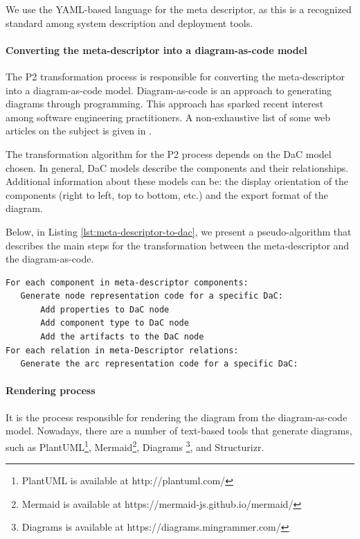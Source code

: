 \documentclass[sigconf]{acmart}
\begin{document}
We use the YAML-based language for the meta descriptor, as this is a recognized standard among system description and deployment tools.

\paragraph{\textbf{Converting the meta-descriptor into a diagram-as-code model}} The P2 transformation process is responsible for converting the meta-descriptor into a diagram-as-code model. Diagram-as-code is an approach to generating diagrams through programming. This approach has sparked recent interest among software engineering practitioners. A non-exhaustive list of some web articles on the subject is given in \cite{flaatten2020, meyer2019, mingrammer2020, brown2020a}. 

The transformation algorithm for the P2 process depends on the DaC model chosen. In general, DaC models describe the components and their relationships. Additional information about these models can be: the display orientation of the components (right to left, top to bottom, etc.) and the export format of the diagram. 

Below, in Listing \ref{lst:meta-descriptor-to-dac}, we present a pseudo-algorithm that describes the main steps for the transformation between the meta-descriptor and the diagram-as-code.

\begin{lstlisting}[caption={Meta-descriptor to Diagram-as-Code algorithm}, label={lst:meta-descriptor-to-dac}]
For each component in meta-descriptor components:
   Generate node representation code for a specific DaC:
       Add properties to DaC node
       Add component type to DaC node
       Add the artifacts to the DaC node
For each relation in meta-Descriptor relations:
   Generate the arc representation code for a specific DaC:
\end{lstlisting}

\paragraph{\textbf{Rendering process}}
It is the process responsible for rendering the diagram from the diagram-as-code model. Nowadays, there are a number of text-based tools that generate diagrams, such as PlantUML\footnote{PlantUML is available at http://plantuml.com/}, Mermaid\footnote{Mermaid is available at https://mermaid-js.github.io/mermaid/}, Diagrams \footnote{Diagrams is available at https://diagrams.mingrammer.com/}, and Structurizr.
\end{document}
